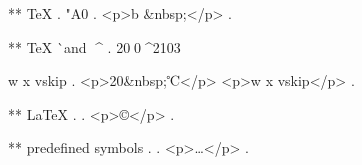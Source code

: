 ** TeX \char
.
 \char"A0
.
<p>b &nbsp;</p>
.

** TeX ^^ and ^^^^
.
20^^A0^^^^2103

^^7 ^^78 vs^^+ip
.
<p>20&nbsp;℃</p>
<p>w x vskip</p>
.


** LaTeX \symbol{}
.
.
<p>©</p>
.


** predefined symbols
.
\textellipsis
.
<p>…</p>
.